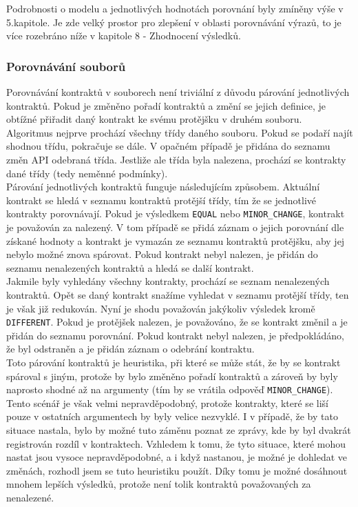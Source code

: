	    	Podrobnosti o modelu a jednotlivých hodnotách porovnání byly zmíněny výše v 5.kapitole. Je zde velký prostor pro zlepšení v oblasti porovnávání výrazů, to je více rozebráno níže v kapitole 8 - Zhodnocení výsledků.
	    
	    \subsubsection{Porovnávání souborů}
	    	Porovnávání kontraktů v souborech není triviální z důvodu párování jednotlivých kontraktů. Pokud je změněno pořadí kontraktů a změní se jejich definice, je obtížné přiřadit daný kontrakt ke svému protějšku v druhém souboru.\\
	    	
	    	Algoritmus nejprve prochází všechny třídy daného souboru. Pokud se podaří najít shodnou třídu, pokračuje se dále. V opačném případě je přidána do seznamu změn API odebraná třída. Jestliže ale třída byla nalezena, prochází se kontrakty dané třídy (tedy neměnné podmínky).\\
	    	
	    	Párování jednotlivých kontraktů funguje následujícím způsobem. Aktuální kontrakt se hledá v seznamu kontraktů protější třídy, tím že se jednotlivé kontrakty porovnávají. Pokud je výsledkem \texttt{EQUAL} nebo \texttt{MINOR\_CHANGE}, kontrakt je považován za nalezený. V tom případě se přidá záznam o jejich porovnání dle získané hodnoty a kontrakt je vymazán ze seznamu kontraktů protějšku, aby jej nebylo možné znova spárovat. Pokud kontrakt nebyl nalezen, je přidán do seznamu nenalezených kontraktů a hledá se další kontrakt.\\
	    	
	    	Jakmile byly vyhledány všechny kontrakty, prochází se seznam nenalezených kontraktů. Opět se daný kontrakt snažíme vyhledat v seznamu protější třídy, ten je však již redukován. Nyní je shodu považován jakýkoliv výsledek kromě \texttt{DIFFERENT}. Pokud je protějšek nalezen, je považováno, že se kontrakt změnil a je přidán do seznamu porovnání. Pokud kontrakt nebyl nalezen, je předpokládáno, že byl odstraněn a je přidán záznam o odebrání kontraktu.\\
	    	
	    	Toto párování kontraktů je heuristika, při které se může stát, že by se kontrakt spároval s jiným, protože by bylo změněno pořadí kontraktů a zároveň by byly naprosto shodné až na argumenty (tím by se vrátila odpověď \texttt{MINOR\_CHANGE}). Tento scénář je však velmi nepravděpodobný, protože kontrakty, které se liší pouze v ostatních argumentech by byly velice nezvyklé. I v případě, že by tato situace nastala, bylo by možné tuto záměnu poznat ze zprávy, kde by byl dvakrát registrován rozdíl v kontraktech. Vzhledem k tomu, že tyto situace, které mohou nastat jsou vysoce nepravděpodobné, a i když nastanou, je možné je dohledat ve změnách, rozhodl jsem se tuto heuristiku použít. Díky tomu je možné dosáhnout mnohem lepších výsledků, protože není tolik kontraktů považovaných za nenalezené.\\
	    	
